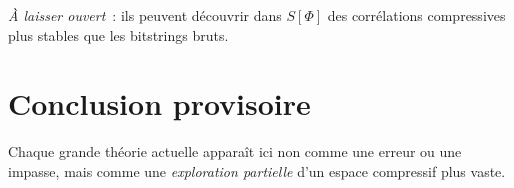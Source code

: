 \documentclass[11pt]{article}
\begin{document}
\emph{À laisser ouvert} : ils peuvent découvrir dans $S[\Phi]$ des corrélations compressives plus stables que les bitstrings bruts.

\section*{Conclusion provisoire}

Chaque grande théorie actuelle apparaît ici non comme une erreur ou une impasse, mais comme une \emph{exploration partielle} d’un espace compressif plus vaste.
\end{document}
